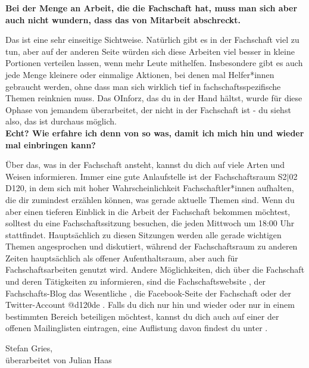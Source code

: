 {    \textbf{Bei der Menge an Arbeit, die die Fachschaft hat, muss man sich aber auch nicht wundern, dass das von Mitarbeit abschreckt.}

    Das ist eine sehr einseitige Sichtweise. Natürlich gibt es in der Fachschaft viel zu tun, aber auf der anderen Seite würden sich diese Arbeiten viel besser in kleine Portionen verteilen lassen, wenn mehr Leute mithelfen. Insbesondere gibt es auch jede Menge kleinere oder einmalige Aktionen, bei denen mal Helfer*innen gebraucht werden, ohne dass man sich wirklich tief in fachschaftsspezifische Themen reinknien muss. Das OInforz, das du in der Hand hältst, wurde für diese Ophase von jemandem überarbeitet, der nicht in der Fachschaft ist - du siehst also, das ist durchaus möglich.\\

    \textbf{Echt? Wie erfahre ich denn von so was, damit ich mich hin und wieder mal einbringen kann?}

    Über das, was in der Fachschaft ansteht, kannst du dich auf viele Arten und Weisen informieren. Immer eine gute Anlaufstelle ist der Fachschaftsraum S2$|$02 D120, in dem sich mit hoher Wahrscheinlichkeit Fachschaftler*innen aufhalten, die dir zumindest erzählen können, was gerade aktuelle Themen sind. Wenn du aber einen tieferen Einblick in die Arbeit der Fachschaft bekommen möchtest, solltest du eine Fachschaftssitzung besuchen, die jeden Mittwoch um 18:00 Uhr stattfindet. Hauptsächlich zu diesen Sitzungen werden alle gerade wichtigen Themen angesprochen und diskutiert, während der Fachschaftsraum zu anderen Zeiten hauptsächlich als offener Aufenthaltsraum, aber auch für Fachschaftsarbeiten genutzt wird. Andere Möglichkeiten, dich über die Fachschaft und deren Tätigkeiten zu informieren, sind die Fachschaftswebsite \footnotemark[3], der Fachschafts-Blog das Wesentliche \footnotemark[4], die Facebook-Seite der Fachschaft \footnotemark[5] oder der Twitter-Account @d120de \footnotemark[6]. Falls du dich nur hin und wieder oder nur in einem bestimmten Bereich beteiligen möchtest, kannst du dich auch auf einer der offenen Mailinglisten eintragen, eine Auflistung davon findest du unter \footnotemark[7].
}
{Stefan Gries,\\
    überarbeitet von Julian Haas}



\newpage
